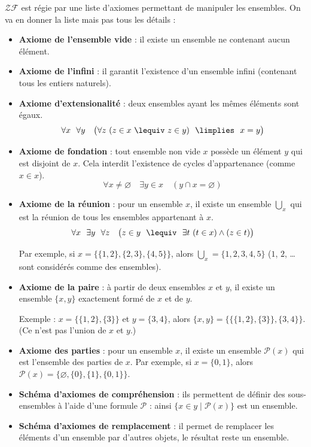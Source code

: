 \documentclass[11pt,class=report,crop=false]{standalone}
\begin{document}
$\mathcal{ZF}$ est régie par une liste d'axiomes permettant de manipuler les ensembles. On va en donner la liste mais pas tous les détails :

\begin{itemize}
	
	\item \textbf{Axiome de l'ensemble vide} : il existe un ensemble ne contenant aucun élément.

	\item \textbf{Axiome de l'infini} : il garantit l'existence d'un ensemble infini (contenant tous
	les entiers naturels).	
	
	\item \textbf{Axiome d'extensionalité} : deux ensembles ayant les mêmes éléments sont égaux.
	\[ \forall x \ \ \forall y \quad \big( \forall z \ (z \in x \  \lequiv \  z \in y) \ \ \limplies \ \ x = y \big) \]
	
	\item \textbf{Axiome de fondation} : tout ensemble non vide $x$ possède un élément $y$ qui est disjoint de $x$. Cela interdit l'existence de cycles d'appartenance (comme $x \in x$).
\[ \forall x \neq \varnothing \quad \exists y \in x \quad (y \cap x = \varnothing) \]

	\item \textbf{Axiome de la réunion} : pour un ensemble $x$, il existe un ensemble $\bigcup_x$ qui est la réunion de tous les ensembles appartenant à $x$.
	\[ \forall x \ \ \exists y \ \ \forall z \quad \big( z \in y \ \ \lequiv \ \ \exists t \ (t \in x) \land (z \in t) \big) \]

	Par exemple, si $x = \big\{ \{1, 2\}, \{2, 3\}, \{4, 5\} \big\}$, alors $\bigcup_x = \{1, 2, 3, 4, 5\}$ ($1$, $2$, \ldots{} sont considérés comme des ensembles).
	
	\item \textbf{Axiome de la paire} : à partir de deux ensembles $x$ et $y$, il existe un ensemble $\{x, y\}$ exactement formé de $x$ et de $y$.

	Exemple : $x = \big\{ \{1, 2\}, \{3\} \big\}$ et $y = \{3, 4\}$, alors $\{x, y\} = \Big\{ \big\{ \{1, 2\}, \{3\} \big\}, \{3, 4\} \Big\}$. (Ce n'est pas l'union de $x$ et $y$.)
	
	\item \textbf{Axiome des parties} : pour un ensemble $x$, il existe un ensemble $\mathcal{P}(x)$ qui est l'ensemble des parties de $x$.
	Par exemple, si $x = \{0, 1\}$, alors $\mathcal{P}(x) = \big\{ \varnothing, \{0\}, \{1\}, \{0, 1\} \big\}$.

	\item \textbf{Schéma d'axiomes de compréhension} : ils permettent de définir des sous-ensembles à l'aide d'une formule $\mathcal{P}$ : ainsi $\{ x \in y \mid \mathcal{P}(x) \}$ est un ensemble.
	
	\item \textbf{Schéma d'axiomes de remplacement} : il permet de remplacer les éléments d'un ensemble par d'autres objets, le résultat reste un ensemble.
\end{itemize}
\end{document}

